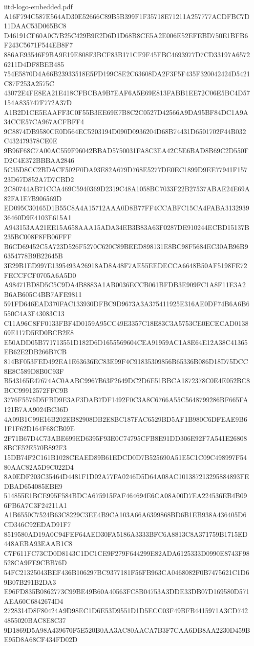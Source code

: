 \begin{filecontents*}[overwrite]{iitd-logo-embedded.pdf}
A16F794C587E564AD30E52666C89B5B399F1F35718E71211A257777ACDFBC7D11DAAC53D065BC8
D46191CF60A0C7B25C429B9E2D6D1D68B8CE5A2E006E52EFEBD750E1BFB6F243C5671F544EB8F7
886AE93546F9BA9E19E808F3BCF83B171CF9F45FBC4693977D7CD33197A65726211D4DF8BEB485
754E5870D4A66B23933518E5FD199C8E2C63608DA2F3F5F435F320042424D5421C87F253A2575C
43072E4FE8EA21E418CFBCBA9B7EAF6A5E69E813FABB1EE72C06E5BC4D57154A835747F772A37D
A1B2D1CE5EAAFF3C0F55B3EE69E7B8C2C0527D42566A9DA95BF84DC1A9A34CCE57CA967ACFBFF4
9C8874DB9580CE0D564EC5203194D090D0936204D68B74431D6501702F44B032C432479378CE0E
9B96F68C7A00AC559F96042BBAD5750031FA8C3EA42C5E6BAD8B69C2D550FD2C4E372BBBAA2846
5C35D8CC2BDACF502F0DA93E82A679D768E5277DE0EC1899D9EE77941F15723D67D852A7D7CBD2
2C80744AB71CCA469C5940369D2319C48A1058BC7033F22B27537ABAE24E69A82FA1E7B906569D
ED095C30165D1B55C8A4A15712AAA0D8B77FF4CCABFC15CA4FABA313293936460D9E4103E615A1
A943153AA21EE15A658AAA15ADA34EB3B83A63F0287DE910244ECBD15137B235BC008F8FB06FFF
B6CD69452C5A723D526F5270C620C89BEED898131E8BC98F5684EC30AB96B96354778B9B22645B
3E29B1ED997E1395493A26918AD8A48F7AE55EEDECCA6648B50AF5198FE72FECCFCF0705A6A5D0
A98471BD8D5C5C9DA4B8883A1AB0036ECCB061BFDB3E909FC1A8F11E3A2B6AB605C4BB7AFE9811
591FD646EAD370FAC133930DFBC9D9673A3A375411925E316AE0DF74B6A6B6550C4A3F43083C13
C11A96C8FF0133FBF4D0159A95CC49E3357C18E83C3A5753CE0ECECAD013869E117D5ED0BCB2E8
E50ADD05B771713551D182D6D1655569604CEA91959AC1A8E64E12A38C41365EB62E2DB266B7CB
814BF053FED492EA1E63636EC83E99F4C91835309856B65336B086D18D75DCC8E8C589D8B0C93F
B543165E47674AC0AABC9967B63F2649DC2D6E51BBCA1872378C0E4E052BC8BCC99912572FFC9B
3776F5576D5FBD9E3AF3DAB7DF1492F0C3A8C6766A55C5648799286BF665FA121B7AA9024BC36D
4A09B1C99E16B202EB82908DB2E8BC187FAC6529BD5AF1B980C6DFEAE9B61F1F62D164F68CB09E
2F71B67D4C73ABE699ED6395F93E0C74795CFB8E91DD306E92F7A541E268088BCE52E570B892F3
15DB74F2C161B1028CEAED89B61EDCD0D7B525690A51E5C1C09C498997F5480AAC82A5D9C022D4
8A0EDF203C35464D4481F1D02A77FA0246D5D64A08AC101387213295884893FEDBAD654085EBE9
514855E1BCE995F584BDCA675915FAF464694E6CA08A00D7EA224536EB4B096FB6A7C3F24211A1
A1B6550C7524B63C8229C3EE4B9CA103A66A6399868BD6B1EB938A436405D6CD346C92EDAD91F7
8519580AD19A0C94FEF64AED30FA5186A3333BFC6A8813C8A371759B1715ED448AEBA93EAAB1C8
C7F611FC73CD0D8143C1DC1CE9F279F644299E82ADA6125333D0990E8743F98528CA9FE9CBB76D
54FC21325043BEF436B106297BC9377181F56FB963CA0468082F0B7475621C1D69B07B291B2DA3
E96FD835B0862773C99BE49B60A40563FC8B04753A3DDE33DB07D169580D571AEA60C6842674D4
2728314D8F80424A9D98EC1D6E53D9551D1D5ECC03F49BFB4415971A3CD7424855020BAC8E8C37
9D1869D5A98A439670F5E520B0AA3AC80AACA7B3F7CAA6DB8AA2230D459BE95D8A68CF434FD02D

\end{filecontents*}
